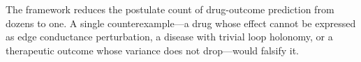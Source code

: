 \documentclass[twocolumn,10pt,a4paper]{article}
\theoremstyle{definition}
\theoremstyle{remark}
\begin{document}
The framework reduces the postulate count of drug-outcome prediction from dozens to one. A single counterexample---a drug whose effect cannot be expressed as edge conductance perturbation, a disease with trivial loop holonomy, or a therapeutic outcome whose variance does not drop---would falsify it.



\end{document}
